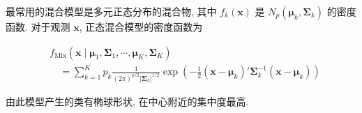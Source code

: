 最常用的混合模型是多元正态分布的混合物, 其中 $f_k(\mathbf{x})$ 是 $N_p(\boldsymbol{\mu}_k,\boldsymbol{\Sigma}_k)$ 的密度函数.
对于观测 $\mathbf{x}$, 正态混合模型的密度函数为

\label{eq:12-17}
\begin{equation}
\begin{aligned}
&f_{\text{Mix}}(\mathbf{x}\mid \boldsymbol{\mu}_1,\boldsymbol{\Sigma}_1,\cdots,\boldsymbol{\mu}_K,\boldsymbol{\Sigma}_K)\\
&\quad=\sum_{k=1}^{K}p_k\frac{1}{(2\pi)^{p/2}|\boldsymbol{\Sigma}_k|^{1/2}}\exp\left(-\frac{1}{2}(\mathbf{x}-\boldsymbol{\mu}_k)'\boldsymbol{\Sigma}_k^{-1}(\mathbf{x}-\boldsymbol{\mu}_k)\right)
\end{aligned} \tag{12-17}
\end{equation}

由此模型产生的类有椭球形状, 在中心附近的集中度最高.

